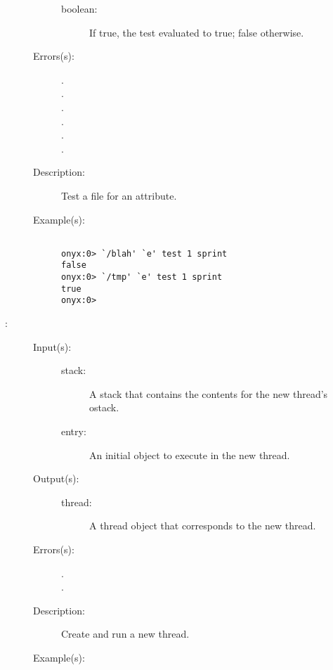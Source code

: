 \begin{description}
\begin{description}
		\begin{description}\item[]
		\item[boolean: ]
			If true, the test evaluated to true; false otherwise.
		\end{description}
	\item[Errors(s): ]
		\begin{description}\item[]
		\item[.]
		\item[.]
		\item[.]
		\item[.]
		\item[.]
		\item[.]
		\end{description}
	\item[Description: ]
		Test a file for an attribute.
	\item[Example(s): ]\begin{verbatim}

onyx:0> `/blah' `e' test 1 sprint
false
onyx:0> `/tmp' `e' test 1 sprint
true
onyx:0>
		\end{verbatim}
	\end{description}
\label{systemdict:thread}
\item[{\onyxop{stack entry}{thread}{thread}}: ]
	\begin{description}\item[]
	\item[Input(s): ]
		\begin{description}\item[]
		\item[stack: ]
			A stack that contains the contents for the new thread's
			ostack.
		\item[entry: ]
			An initial object to execute in the new thread.
		\end{description}
	\item[Output(s): ]
		\begin{description}\item[]
		\item[thread: ]
			A thread object that corresponds to the new thread.
		\end{description}
	\item[Errors(s): ]
		\begin{description}\item[]
		\item[.]
		\item[.]
		\end{description}
	\item[Description: ]
		Create and run a new thread.
	\item[Example(s): ]\begin{verbatim}


\end{verbatim}
\end{description}
\end{description}
